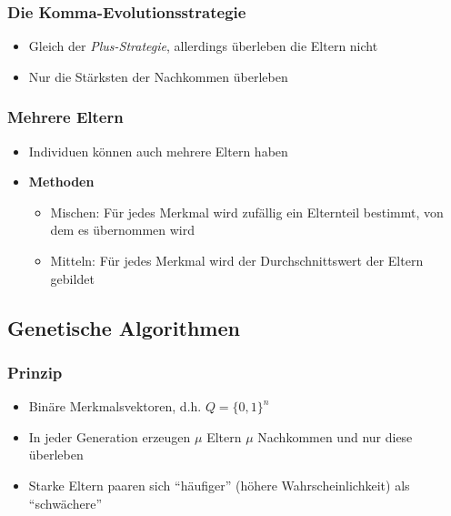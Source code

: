 \subsubsection{Die Komma-Evolutionsstrategie}
\begin{itemize}
	\item Gleich der \textit{Plus-Strategie}, allerdings überleben die Eltern nicht
	\item Nur die Stärksten der Nachkommen überleben
\end{itemize}

\subsubsection{Mehrere Eltern}
\begin{itemize}
	\item Individuen können auch mehrere Eltern haben
	\item \textbf{Methoden}
	\begin{itemize}
		\item Mischen: Für jedes Merkmal wird zufällig ein Elternteil bestimmt, von dem es übernommen wird
		\item Mitteln: Für jedes Merkmal wird der Durchschnittswert der Eltern gebildet
	\end{itemize}
\end{itemize}


\subsection{Genetische Algorithmen}

\subsubsection{Prinzip}
\begin{itemize}
	\item Binäre Merkmalsvektoren, d.h. \(Q = \{0,1\}^n\)
	\item In jeder Generation erzeugen \(\mu\) Eltern \(\mu\) Nachkommen und nur diese überleben
	\item Starke Eltern paaren sich "`häufiger"' (höhere Wahrscheinlichkeit) als "`schwächere"'
\end{itemize}

